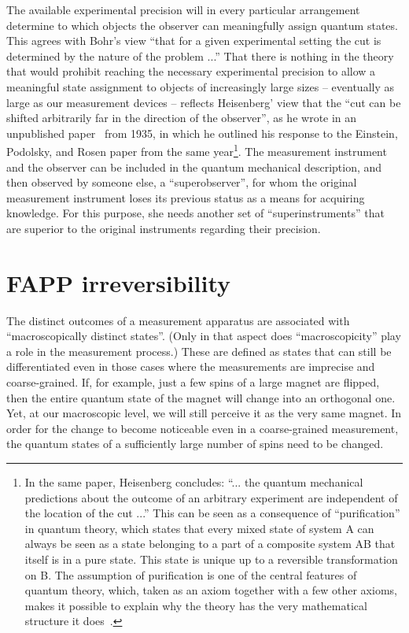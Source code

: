 \documentclass[12pt]{article}
\begin{document}
The available experimental precision will in every particular arrangement determine to which objects the observer can meaningfully assign quantum states. This agrees with Bohr's view ``that for a given experimental setting the cut is determined by the nature of the problem ...'' That there is nothing in the theory that would prohibit reaching the necessary experimental precision to allow a meaningful state assignment to objects of increasingly large sizes -- eventually as large as our measurement devices -- reflects Heisenberg' view that the ``cut can be shifted arbitrarily far in the direction of the observer'', as he wrote in an unpublished paper~\cite{heisenberg} from 1935, in which he outlined his response to the Einstein, Podolsky, and Rosen paper from the same year\footnote{In the same paper, Heisenberg concludes: ``... the quantum mechanical predictions about the outcome of an arbitrary experiment are independent of the location of the cut ...'' This can be seen as a consequence of ``purification'' in quantum theory, which states that every mixed state of system A can always be seen as a state belonging to a part of a composite system AB that itself is in a pure state. This state is unique up to a reversible transformation on B. The assumption of purification is one of the central features of quantum theory, which, taken as an axiom together with a few other axioms, makes it possible to explain why the theory has the very mathematical structure it does~\cite{chiribella}.}. The measurement instrument and the observer can be included in the quantum mechanical description, and then observed by someone else, a ``superobserver'', for whom the original measurement instrument loses its previous status as a means for acquiring knowledge. For this purpose, she needs another set of ``superinstruments'' that are superior to the original instruments regarding their precision. 

\section{FAPP  irreversibility}
 
The distinct outcomes of a measurement apparatus are associated with ``macroscopically distinct states''. (Only in that aspect does ``macroscopicity'' play a role in the measurement process.) These are defined as states that can still be differentiated even in those cases where the measurements are imprecise and coarse-grained. If, for example, just a few spins of a large magnet are flipped, then the entire quantum state of the magnet will change into an orthogonal one. Yet, at our macroscopic level, we will still perceive it as the very same magnet. In order for the change to become noticeable even in a coarse-grained measurement, the quantum states of a sufficiently large number of spins need to be changed.   
\end{document}

